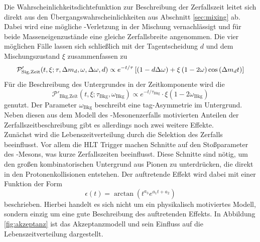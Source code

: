 Die Wahrscheinlichkeitsdichtefunktion zur Beschreibung der Zerfallszeit leitet sich direkt aus den Übergangswahrscheinlichkeiten aus Abschnitt \ref{sec:mixing} ab. Dabei wird eine mögliche \CP-Verletzung in der Mischung vernachlässigt und für beide Masseneigenzustände eine gleiche Zerfallsbreite angenommen. Die vier möglichen Fälle lassen sich schließlich mit der Tagentscheidung $d$ und dem Mischungszustand $\xi$ zusammenfassen zu
\begin{equation}
\mathcal{P}'_\text{Sig,Zeit}(t,\xi;\tau,{\Delta m_{{d}}},\omega,\Delta\omega,d)\propto e^{-t/\tau}\left[\left(1-d\Delta\omega\right)+\xi\left(1-2\omega\right)\cos\left({\Delta m_{{d}}} t\right)\right]
\end{equation}
Für die Beschreibung des Untergrundes in der Zeitkomponente wird die \PDF 
\begin{equation}
\mathcal{P}'_\text{Bkg,Zeit}(t,\xi;\tau_\text{Bkg},\omega_\text{Bkg})\propto e^{-t/\tau_\text{Bkg}}\cdot\xi\left(1-2\omega_\text{Bkg}\right)
\end{equation}
genutzt. Der Parameter $\omega_\text{Bkg}$ beschreibt eine tag-Asymmetrie im Untergrund. Neben diesen aus dem Modell des \B-Mesonenzerfalls motivierten Anteilen der Zerfallszeitbeschreibung gibt es allerdings noch zwei weitere  Effekte. \\ 
Zunächst wird die Lebenszeitverteilung durch die Selektion des Zerfalls beeinflusst. Vor allem die HLT Trigger machen Schnitte auf den Stoßparameter des \Bz-Mesons, was kurze Zerfallszeiten beeinflusst. Diese Schnitte sind nötig, um den großen kombinatorischen Untergrund aus Pionen zu unterdrücken, die direkt in den Protonenkollisionen entstehen. Der auftretende Effekt wird dabei mit einer Funktion der Form
\begin{equation}
\epsilon(t)=\arctan\left(t^{a_3}e^{a_1t+a_2}\right)
\end{equation}
beschrieben. Hierbei handelt es sich nicht um ein physikalisch motiviertes Modell, sondern einzig um eine gute Beschreibung des auftretenden Effekts. In Abbildung \ref{fig:akzeptanz} ist das Akzeptanzmodell und sein Einfluss auf die Lebenszeitverteilung dargestellt.
